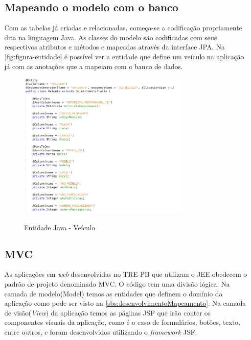 \subsection{Mapeando o modelo com o banco}
\label{sbs:desenvolvimentoMapeamento}

Com as tabelas já criadas e relacionadas, começa-se a codificação propriamente dita na linguagem Java. As classes do modelo são codificadas com seus respectivos atributos e métodos e mapeadas através da interface JPA. Na \autoref{fig:figura-entidade} é possível ver a entidade que define um veículo na aplicação já com as anotações que a mapeiam com o banco de dados.

\begin{figure}[!htb]
    \centering
    \caption{Entidade Java - Veículo}
    \includegraphics[width=0.75\textwidth]{dados/figuras/entidade.png}
    \label{fig:figura-entidade}
\end{figure}

\subsection{MVC}
\label{sbs:desenvolvimentoMVC}

As aplicações em \textit{web} desenvolvidas no TRE-PB que utilizam o JEE obedecem o padrão de projeto denominado MVC. O código tem uma divisão lógica. 
Na camada de modelo(Model) temos as entidades que definem o domínio da aplicação como pode ser visto na \autoref{sbs:desenvolvimentoMapeamento}. 
Na camada de visão(\textit{View}) da aplicação temos as páginas JSF que irão conter os componentes visuais da aplicação, como é o caso de formulários, botões, texto, entre outros, e foram desenvolvidos utilizando o \textit{framework} JSF. 

